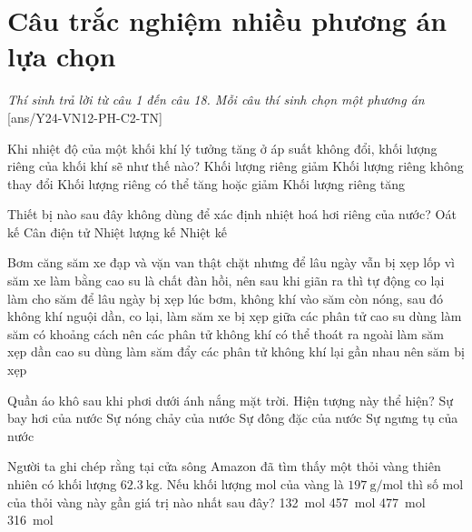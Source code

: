 \section{Câu trắc nghiệm nhiều phương án lựa chọn}
\textit{Thí sinh trả lời từ câu 1 đến câu 18. Mỗi câu thí sinh chọn một phương án}
\setcounter{ex}{0}
[ans/Y24-VN12-PH-C2-TN]
\begin{ex}
	Khi nhiệt độ của một khối khí lý tưởng tăng ở áp suất không đổi, khối lượng riêng của khối khí sẽ như thế nào?
	\choice
	{\True Khối lượng riêng giảm}
	{Khối lượng riêng không thay đổi}
	{Khối lượng riêng có thể tăng hoặc giảm}
	{Khối lượng riêng tăng}
	\loigiai{}
\end{ex}
\begin{ex}
	Thiết bị nào sau đây không dùng để xác định nhiệt hoá hơi riêng của nước?
	\choice
	{Oát kế}
	{Cân điện tử}
	{Nhiệt lượng kế}
	{\True Nhiệt kế}
	\loigiai{}
\end{ex}
\begin{ex}
	Bơm căng săm xe đạp và vặn van thật chặt nhưng để lâu ngày vẫn bị xẹp lốp vì
	\choice
	{săm xe làm bằng cao su là chất đàn hồi, nên sau khi giãn ra thì tự động co lại làm cho săm để lâu ngày bị xẹp}
	{lúc bơm, không khí vào săm còn nóng, sau đó không khí nguội dần, co lại, làm săm xe bị xẹp}
	{\True giữa các phân tử cao su dùng làm săm có khoảng cách nên các phân tử không khí có thể thoát ra ngoài làm săm xẹp dần}
	{cao su dùng làm săm đẩy các phân tử không khí lại gần nhau nên săm bị xẹp}
	\loigiai{}
\end{ex}
\begin{ex}
	 Quần áo khô sau khi phơi dưới ánh nắng mặt trời. Hiện tượng này thể hiện?
	\choice
	{\True Sự bay hơi của nước}
	{Sự nóng chảy của nước}
	{Sự đông đặc của nước}
	{Sự ngưng tụ của nước}
	\loigiai{}
\end{ex}
\begin{ex}
Người ta ghi chép rằng tại cửa sông Amazon đã tìm thấy một thỏi vàng thiên nhiên có khối lượng $\SI{62.3}{\kilogram}$. Nếu khối lượng mol của vàng là $\SI{197}{\gram/\mole}$ thì số mol của thỏi vàng này gần giá trị nào nhất sau đây?	
	\choice
	{\SI{132}{\mole}}
	{\SI{457}{\mole}}
	{\SI{477}{\mole}}
	{\True \SI{316}{\mole}}
	\loigiai{}
\end{ex}
